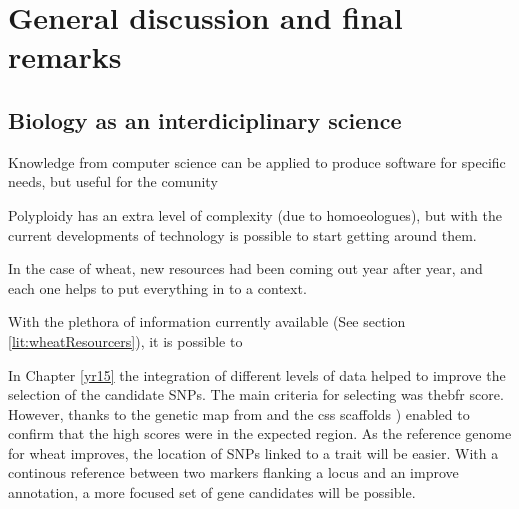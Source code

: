 
\chapter{General discussion and final remarks}
\label{cha:discussion}


\section{Biology as an interdiciplinary science}

Knowledge from  computer science can be applied to produce software for specific needs, but useful for the comunity

Polyploidy has an extra level of complexity (due to homoeologues), but with the current developments of technology is possible to start getting around them. 



In the case of wheat, new resources had been coming out year after year, and each one helps to put everything in to a context. 

With the plethora of information currently available (See section \ref{lit:wheatResourcers}), it is possible to 


In Chapter \ref{yr15} the integration of different levels of data helped to improve the selection of the candidate SNPs. 
The main criteria for selecting   was the\acrshort{bfr} score.
However, thanks to the genetic map from \citet{Wang2014} and the \acrshort{css} scaffolds \citep{Mayer2014}) enabled to confirm that the high scores were in the expected region. 
As the reference genome for wheat improves, the location of SNPs linked to a trait will be easier. 
With a continous reference between two markers flanking a locus and an improve annotation, a more focused set of gene candidates will be possible. 


